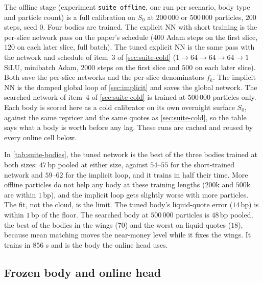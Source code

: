 \documentclass[11pt,a4paper]{article}
\newcommand{\bp}{\,\mathrm{bp}}
\newcommand{\code}[1]{\texttt{#1}}
\begin{document}
The offline stage (experiment \code{suite\_offline}, one run per scenario, body type and particle count) is a full calibration on $S_0$ at $200\,000$ or $500\,000$ particles, $200$ steps, seed $0$. Four bodies are trained. The explicit NN with short training is the per-slice network pass on the paper's schedule ($400$ Adam steps on the first slice, $120$ on each later slice, full batch). The tuned explicit NN is the same pass with the network and schedule of item~3 of \cref{sec:suite-cold} ($1\to64\to64\to64\to1$ SiLU, minibatch Adam, $2000$ steps on the first slice and $500$ on each later slice). Both save the per-slice networks and the per-slice denominators $f_k$. The implicit NN is the damped global loop of \cref{sec:implicit} and saves the global network. The searched network of item~4 of \cref{sec:suite-cold} is trained at $500\,000$ particles only. Each body is scored here as a cold calibrator on its own overnight surface $S_0$, against the same repricer and the same quotes as \cref{sec:suite-cold}, so the table says what a body is worth before any lag. These runs are cached and reused by every online cell below.

\begin{table}[h]\centering\footnotesize
\caption{Offline bodies as cold calibrators on $S_0$, $20$ SSVI scenarios, seed $0$; training time is the full offline calibration. Bold: the best method row in each column; the PDE floor is the reference and is not a contender.}\label{tab:suite-bodies}

\end{table}

In \cref{tab:suite-bodies}, the tuned network is the best of the three bodies trained at both sizes: $47\bp$ pooled at either size, against $54$--$55$ for the short-trained network and $59$--$62$ for the implicit loop, and it trains in half their time. More offline particles do not help any body at these training lengths ($200$k and $500$k are within $1\bp$), and the implicit loop gets slightly worse with more particles. The fit, not the cloud, is the limit. The tuned body's liquid-quote error ($14\bp$) is within $1\bp$ of the floor. The searched body at $500\,000$ particles is $48\bp$ pooled, the best of the bodies in the wings ($70$) and the worst on liquid quotes ($18$), because mean matching moves the near-money level while it fixes the wings. It trains in $856$ s and is the body the online head uses.


\subsection{Frozen body and online head}\label{sec:suite-heads}
\end{document}
